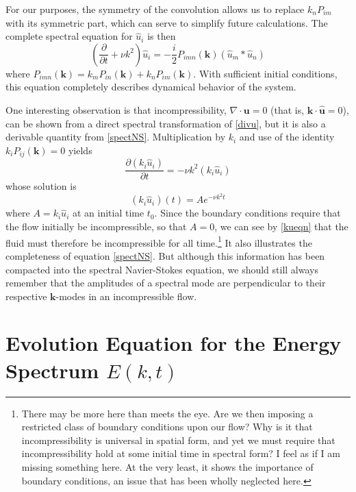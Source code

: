 \documentclass[letterpaper, 11pt, onecolumn, oneside]{article}
\newcommand{\pdiff}[2]{\frac{\partial #1}{\partial #2}}
\begin{document}
For our purposes, the symmetry of the convolution allows us to replace $k_n P_{im}$ with its symmetric part, which can serve to simplify future calculations. The complete spectral equation for $\hat{u}_i$ is then
\begin{equation}\label{spectNS}
	\left(\pdiff{}{t} + \nu k^2 \right) \hat{u}_i = -\frac{i}{2} P_{imn}(\bm{k}) (\hat{u}_m * \hat{u}_n)
\end{equation}
where $P_{imn}(\bm{k}) = k_m P_{in}(\bm{k}) + k_n P_{im}(\bm{k})$. With sufficient initial conditions, this equation completely describes dynamical behavior of the system.

One interesting observation is that incompressibility, $\nabla \cdot \bm{u} = 0$ (that is, $\bm{k} \cdot \hat{\bm{u}} = 0$), can be shown from a direct spectral transformation of \eqref{divu}, but it is also a derivable quantity from \eqref{spectNS}. Multiplication by $k_i$ and use of the identity $k_i P_{ij}(\bm{k}) = 0$ yields
\begin{equation}
	\pdiff{(k_i \hat{u}_i)}{t} = -\nu k^2 (k_i \hat{u}_i)
\end{equation}
whose solution is
\begin{equation}\label{kueqn}
	(k_i \hat{u}_i)(t) = A e^{-\nu k^2 t}
\end{equation}
where $A = k_i \hat{u}_i$ at an initial time $t_0$. Since the boundary conditions require that the flow initially be incompressible, so that $A = 0$, we can see by \eqref{kueqn} that the fluid must therefore be incompressible for all time.\footnote{There may be more here than meets the eye. Are we then imposing a restricted class of boundary conditions upon our flow? Why is it that incompressibility is universal in spatial form, and yet we must require that incompressibility hold at some initial time in spectral form? I feel as if I am missing something here. At the very least, it shows the importance of boundary conditions, an issue that has been wholly neglected here.} It also illustrates the completeness of equation \eqref{spectNS}. But although this information has been compacted into the spectral Navier-Stokes equation, we should still always remember that the amplitudes of a spectral mode are perpendicular to their respective $\bm{k}$-modes in an incompressible flow.

\section{Evolution Equation for the Energy Spectrum $E(k,t)$}
\end{document}
